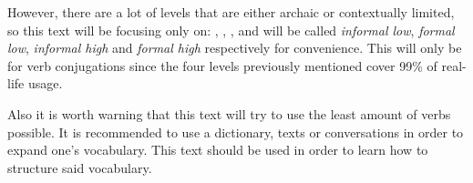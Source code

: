However, there are a lot of levels that are either archaic or contextually limited, so this text will be focusing only on: , , ,  and will be called \textit{informal low}, \textit{formal low}, \textit{informal high} and \textit{formal high} respectively for convenience. This will only be for verb conjugations since the four levels previously mentioned cover 99\% of real-life usage.

Also it is worth warning that this text will try to use the least amount of verbs possible. It is recommended to use a dictionary, texts or conversations in order to expand one's vocabulary. This text should be used in order to learn how to structure said vocabulary.